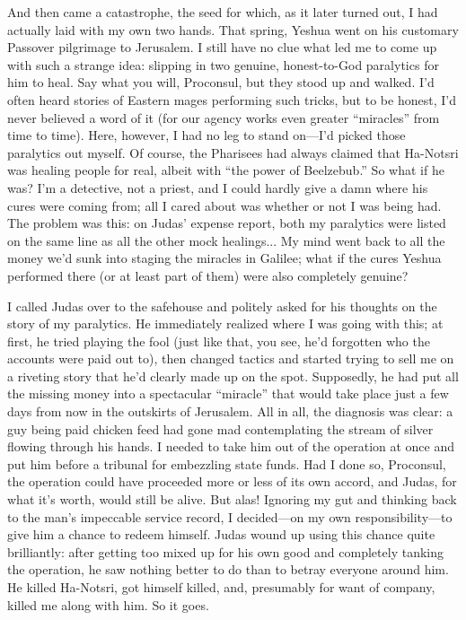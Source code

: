 And then came a catastrophe, the seed for which, as it later turned out, I had actually laid with my own two hands. That spring, Yeshua went on his customary Passover pilgrimage to Jerusalem. I still have no clue what led me to come up with such a strange idea: slipping in two genuine, honest-to-God paralytics for him to heal. Say what you will, Proconsul, but they stood up and walked. I'd often heard stories of Eastern mages performing such tricks, but to be honest, I'd never believed a word of it (for our agency works even greater ``miracles'' from time to time). Here, however, I had no leg to stand on---I'd picked those paralytics out myself. Of course, the Pharisees had always claimed that Ha-Notsri was healing people for real, albeit with ``the power of Beelzebub.'' So what if he was? I'm a detective, not a priest, and I could hardly give a damn where his cures were coming from; all I cared about was whether or not I was being had. The problem was this: on Judas' expense report, both my paralytics were listed on the same line as all the other mock healings... My mind went back to all the money we'd sunk into staging the miracles in Galilee; what if the cures Yeshua performed there (or at least part of them) were also completely genuine?

I called Judas over to the safehouse and politely asked for his thoughts on the story of my paralytics. He immediately realized where I was going with this; at first, he tried playing the fool (just like that, you see, he'd forgotten who the accounts were paid out to), then changed tactics and started trying to sell me on a riveting story that he'd clearly made up on the spot. Supposedly, he had put all the missing money into a spectacular ``miracle'' that would take place just a few days from now in the outskirts of Jerusalem. All in all, the diagnosis was clear: a guy being paid chicken feed had gone mad contemplating the stream of silver flowing through his hands. I needed to take him out of the operation at once and put him before a tribunal for embezzling state funds. Had I done so, Proconsul, the operation could have proceeded more or less of its own accord, and Judas, for what it's worth, would still be alive. But alas! Ignoring my gut and thinking back to the man's impeccable service record, I decided---on my own responsibility---to give him a chance to redeem himself. Judas wound up using this chance quite brilliantly: after getting too mixed up for his own good and completely tanking the operation, he saw nothing better to do than to betray everyone around him. He killed Ha-Notsri, got himself killed, and, presumably for want of company, killed me along with him. So it goes.

